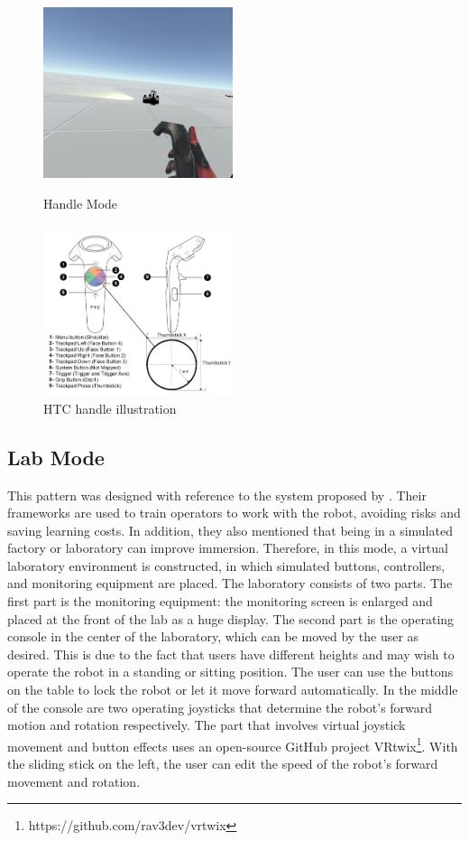 \begin{figure}[htbp]
    \centering
    \begin{minipage}[t]{0.48\textwidth}
        \centering
        \includegraphics[height=5cm]{graphics/handle1.png}
        \caption{Handle Mode}
        \label{fig:handle}
    \end{minipage}
    \begin{minipage}[t]{0.48\textwidth}
        \centering
        \includegraphics[height=5cm]{graphics/htc.png}
        \caption{HTC handle illustration}
        \label{fig:htc}
    \end{minipage}
\end{figure}


\subsection{Lab Mode}
This pattern was designed with reference to the system proposed by \cite{Matsas:2017aa}\cite{Perez:2019ub}. Their frameworks are used to train operators to work with the robot, avoiding risks and saving learning costs. In addition, they also mentioned that being in a simulated factory or laboratory can improve immersion. Therefore, in this mode, a virtual laboratory environment is constructed, in which simulated buttons, controllers, and monitoring equipment are placed. The laboratory consists of two parts. The first part is the monitoring equipment: the monitoring screen is enlarged and placed at the front of the lab as a huge display. The second part is the operating console in the center of the laboratory, which can be moved by the user as desired. This is due to the fact that users have different heights and may wish to operate the robot in a standing or sitting position. The user can use the buttons on the table to lock the robot or let it move forward automatically. In the middle of the console are two operating joysticks that determine the robot's forward motion and rotation respectively. The part that involves virtual joystick movement and button effects uses an open-source GitHub project VRtwix\footnote{https://github.com/rav3dev/vrtwix}. With the sliding stick on the left, the user can edit the speed of the robot's forward movement and rotation.

